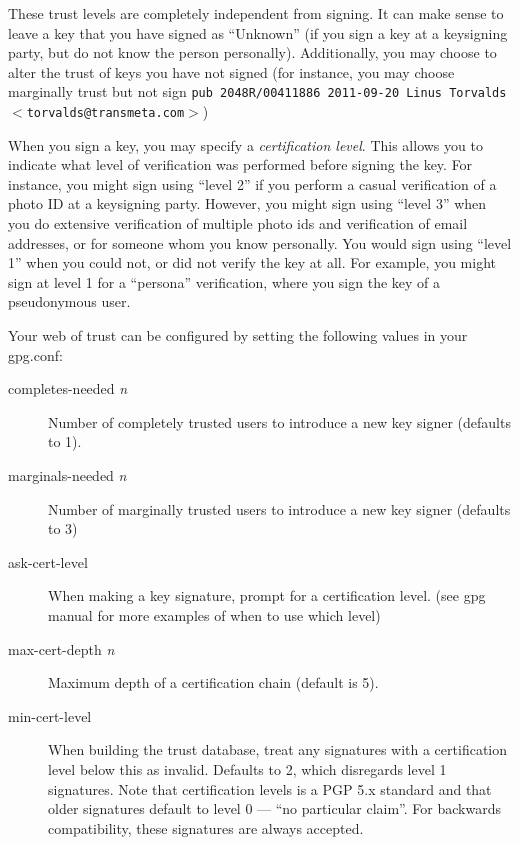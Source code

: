\documentclass[letterpaper]{article}
\renewcommand{\_}[1]{\ifmmode_{_{#1}}\else\underline{\phantom{n}}$\,$#1\fi}
\begin{document}
These trust levels are completely independent from signing. It can make
sense to leave a key that you have signed as ``Unknown'' (if you sign a key
at a keysigning party, but do not know the person personally).
Additionally, you may choose to alter the trust of keys you have not signed
(for instance, you may choose marginally trust but not sign
\texttt{pub  2048R/00411886 2011-09-20 Linus Torvalds $<$torvalds@transmeta.com$>$})


When you sign a key, you may specify a \textsl{certification level}. This
allows you to indicate what level of verification was performed before
signing the key. For instance, you might sign using ``level 2'' if you
perform a casual verification of a photo ID at a keysigning party. However,
you might sign using ``level 3'' when you do extensive verification of
multiple photo ids and verification of email addresses, or for someone whom
you know personally. You would sign using ``level 1'' when you could not,
or did not verify the key at all. For example, you might sign at level 1
for a ``persona'' verification, where you sign the key of a pseudonymous
user.

Your web of trust can be configured by setting the following values in your gpg.conf:

\begin{description}
\item[completes-needed \textsl{n}] Number of completely trusted users to introduce a
  new key signer (defaults to 1).

\item[marginals-needed \textsl{n}] Number of marginally trusted users to introduce a
  new key signer (defaults to 3)

\item[ask-cert-level] When making a key signature, prompt for a
  certification level. (see gpg manual for more examples of when to use
  which level)


\item[max-cert-depth \textsl{n}] Maximum depth of a certification chain (default is
  5).

\item[min-cert-level] When building the trust database, treat any
  signatures with a certification level below this as invalid. Defaults to
  2, which disregards level 1 signatures. Note that certification levels is
  a PGP 5.x standard and that older signatures default to level 0 --- ``no
  particular claim''. For backwards compatibility, these signatures are
  always accepted.
\end{description}
\end{document}
